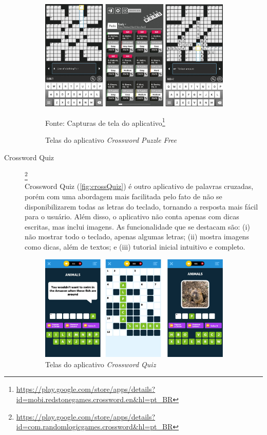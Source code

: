 \begin{description}
\begin{figure}[H]
\centering
    \caption{Telas do aplicativo \textit{Crossword Puzzle Free}}
    \label{fig:crossFree}
    \includegraphics[width=0.9\textwidth]{Figuras/crosswordPuzzleFree.jpg}
    
    Fonte: Capturas de tela do aplicativo\footnote{\url{https://play.google.com/store/apps/details?id=mobi.redstonegames.crossword.en&hl=pt_BR}}
\end{figure}

\item[Crossword Quiz]\footnote{\url{https://play.google.com/store/apps/details?id=com.randomlogicgames.crossword&hl=pt_BR}} \hfill \\
Crossword Quiz (\autoref{fig:crossQuiz}) é outro aplicativo de palavras cruzadas, porém com uma abordagem mais facilitada pelo fato de não se disponibilizarem todas as letras do teclado, tornando a resposta mais fácil para o usuário. Além disso, o aplicativo não conta apenas com dicas escritas, mas inclui imagens. As funcionalidade que se destacam são: (i) não mostrar todo o teclado, apenas algumas letras; (ii) mostra imagens como dicas, além de textos; e (iii) tutorial inicial intuitivo e completo.

\begin{figure}[H]
\centering
    \caption{Telas do aplicativo \textit{Crossword Quiz}}
    \label{fig:crossQuiz}
    \includegraphics[width=0.9\textwidth]{Figuras/crosswordQuiz.jpg}
    

\end{figure}
\end{description}
